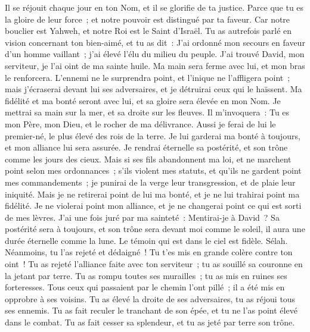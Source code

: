\begin{multicols}{2}
Il se réjouit chaque jour en ton Nom, et il se glorifie de ta justice.
Parce que tu es la gloire de leur force~; et notre pouvoir est distingué par ta faveur.
Car notre bouclier est Yahweh, et notre Roi est le Saint d'Israël.
Tu as autrefois parlé en vision concernant ton bien-aimé, et tu as dit~: J'ai ordonné mon secours en faveur d'un homme vaillant~; j'ai élevé l'élu du milieu du peuple.
J'ai trouvé David, mon serviteur, je l'ai oint de ma sainte huile.
Ma main sera ferme avec lui, et mon bras le renforcera.
L'ennemi ne le surprendra point, et l'inique ne l'affligera point~;
mais j'écraserai devant lui ses adversaires, et je détruirai ceux qui le haïssent.
Ma fidélité et ma bonté seront avec lui, et sa gloire sera élevée en mon Nom.
Je mettrai sa main sur la mer, et sa droite sur les fleuves.
Il m'invoquera~: Tu es mon Père, mon Dieu, et le rocher de ma délivrance.
Aussi je ferai de lui le premier-né, le plus élevé des rois de la terre.
Je lui garderai ma bonté à toujours, et mon alliance lui sera assurée.
Je rendrai éternelle sa postérité, et son trône comme les jours des cieux.
Mais si ses fils abandonnent ma loi, et ne marchent point selon mes ordonnances~;
s'ils violent mes statuts, et qu'ils ne gardent point mes commandements~;
je punirai de la verge leur transgression, et de plaie leur iniquité.
Mais je ne retirerai point de lui ma bonté, et je ne lui trahirai point ma fidélité.
Je ne violerai point mon alliance, et je ne changerai point ce qui est sorti de mes lèvres.
J'ai une fois juré par ma sainteté~: Mentirai-je à David~?
Sa postérité sera à toujours, et son trône sera devant moi comme le soleil,
il aura une durée éternelle comme la lune. Le témoin qui est dans le ciel est fidèle. Sélah.
Néanmoins, tu l'as rejeté et dédaigné~! Tu t'es mis en grande colère contre ton oint~!
Tu as rejeté l'alliance faite avec ton serviteur~; tu as souillé sa couronne en la jetant par terre.
Tu as rompu toutes ses murailles~; tu as mis en ruines ses forteresses.
Tous ceux qui passaient par le chemin l'ont pillé~; il a été mis en opprobre à ses voisins.
Tu as élevé la droite de ses adversaires, tu as réjoui tous ses ennemis.
Tu as fait reculer le tranchant de son épée, et tu ne l'as point élevé dans le combat.
Tu as fait cesser sa splendeur, et tu as jeté par terre son trône.

\end{multicols}
